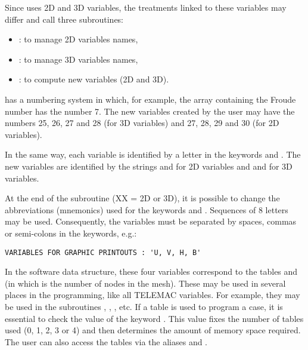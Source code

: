 Since  uses 2D and 3D variables, the treatments linked to these
variables may differ and call three subroutines:

\begin{itemize}
\item  {}: to manage 2D variables names,

\item  {}: to manage 3D variables names,

\item  {}: to compute new variables (2D and 3D).
\end{itemize}

 has a numbering system in which, for example, the array containing
the Froude number has the number 7. The new variables created by the user may
have the numbers 25, 26, 27 and 28 (for 3D variables) and 27, 28, 29 and 30
(for 2D variables).

In the same way, each variable is identified by a letter in the keywords
 and
.
The new variables are identified by the strings 
and  for 2D variables and  and 
for 3D variables.

At the end of the  subroutine (XX = 2D or 3D), it is
possible to change the abbreviations (mnemonics) used for the keywords
 and . Sequences of 8 letters may be used.
Consequently, the variables must be separated by spaces, commas or semi-colons
in the keywords, e.g.:

\begin{lstlisting}[language=TelemacCas]
VARIABLES FOR GRAPHIC PRINTOUTS : 'U, V, H, B'
\end{lstlisting}

In the software data structure, these four variables correspond to the tables
and  (in which  is the number of
nodes in the mesh). These may be used in several places in the programming,
like all TELEMAC variables.
For example, they may be used in the subroutines ,
, , etc.  If a  table is used
to program a case, it is essential to check the value of the keyword
.
This value fixes the number of tables used (0, 1, 2, 3 or 4)
and then determines the amount of memory space required. The user can also
access the tables via the aliases  and
.

